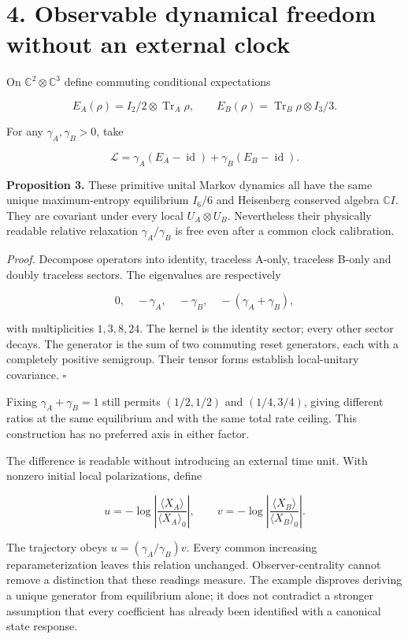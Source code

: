 \documentclass[
  11pt,
  a4paper,
]{article}
\begin{document}
\section{4. Observable dynamical freedom without an external clock}\label{observable-dynamical-freedom-without-an-external-clock}

On \(\mathbb C^2\otimes\mathbb C^3\) define commuting conditional expectations

\[E_A(\rho)=I_2/2\otimes\operatorname{Tr}_A\rho,
\qquad E_B(\rho)=\operatorname{Tr}_B\rho\otimes I_3/3.\]

For any \(\gamma_A,\gamma_B>0\), take

\[\mathcal L=\gamma_A(E_A-\operatorname{id})
+\gamma_B(E_B-\operatorname{id}).\]

\textbf{Proposition 3.} These primitive unital Markov dynamics all have the same unique maximum-entropy equilibrium \(I_6/6\) and Heisenberg conserved algebra \(\mathbb CI\). They are covariant under every local \(U_A\otimes U_B\). Nevertheless their physically readable relative relaxation \(\gamma_A/\gamma_B\) is free even after a common clock calibration.

\emph{Proof.} Decompose operators into identity, traceless A-only, traceless B-only and doubly traceless sectors. The eigenvalues are respectively

\[0,\quad-\gamma_A,\quad-\gamma_B,\quad-(\gamma_A+\gamma_B),\]

with multiplicities \(1,3,8,24\). The kernel is the identity sector; every other sector decays. The generator is the sum of two commuting reset generators, each with a completely positive semigroup. Their tensor forms establish local-unitary covariance. \(\square\)

Fixing \(\gamma_A+\gamma_B=1\) still permits \((1/2,1/2)\) and \((1/4,3/4)\), giving different ratios at the same equilibrium and with the same total rate ceiling. This construction has no preferred axis in either factor.

The difference is readable without introducing an external time unit. With nonzero initial local polarizations, define

\[u=-\log\left|\frac{\langle X_A\rangle}{\langle X_A\rangle_0}\right|,
\qquad v=-\log\left|\frac{\langle X_B\rangle}{\langle X_B\rangle_0}\right|.\]

The trajectory obeys \(u=(\gamma_A/\gamma_B)v\). Every common increasing reparameterization leaves this relation unchanged. Observer-centrality cannot remove a distinction that these readings measure. The example disproves deriving a unique generator from equilibrium alone; it does not contradict a stronger assumption that every coefficient has already been identified with a canonical state response.
\end{document}

